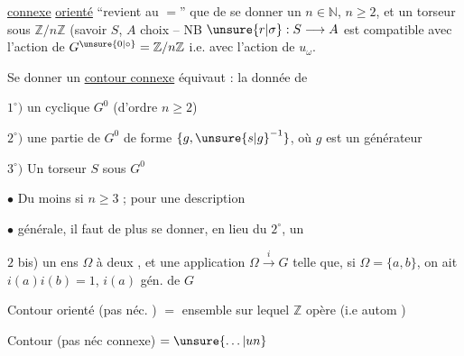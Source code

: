 \uline{connexe} \uline{orienté} ``revient au $=$'' que de se donner un $n\in\mathbb{N}$, $n\geq2$, et un  torseur sous $\mathbb{Z}/n\mathbb{Z}$ (savoir $S$,  $A$  choix -- NB $\unsure{r|\sigma}:S\longrightarrow A$ est compatible avec l'action de $G^{\unsure{0|\circ}}=\mathbb{Z}/n\mathbb{Z}$ i.e. avec l'action de $u_{\omega}$.

Se donner un \uline{contour connexe} équivaut : la donnée de

$1^{\circ})$ un  cyclique $G^{0}$ (d'ordre $n\geq2$)

$2^{\circ})$ une  partie de $G^{0}$  de  forme $\{g,\unsure{s|g}^{-1}\}$, où $g$ est un générateur 

$3^{\circ})$ Un torseur $S$ sous $G^{0}$

$\bullet$ Du moins si $n\geq3$  ; pour une description

$\bullet$ générale, il faut de plus se donner, en lieu du $2^{\circ}$, un

$2$ bis) un ens $\Omega$ à deux , et une application $\Omega\xrightarrow{i}G$ telle que, si $\Omega=\{a,b\}$, on ait $i(a)i(b)=1$, $i(a)$ gén. de $G$


Contour orienté (pas néc. ) $=$ ensemble sur lequel $\mathbb{Z}$ opère (i.e  autom )

Contour (pas néc connexe) $=\unsure{\ldots|un}$
